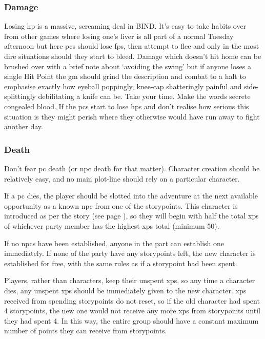 \begin{multicols}{2}
\subsubsection{Damage}

Losing \gls{hp} is a massive, screaming deal in BIND.
It's easy to take habits over from other games where losing one's liver is all part of a normal Tuesday afternoon but here \glspl{pc} should lose \glspl{fp}, then attempt to flee and only in the most dire situations should they start to bleed.
Damage which doesn't hit home can be brushed over with a brief note about `avoiding the swing' but if anyone loses a single Hit Point the \gls{gm} should grind the description and combat to a halt to emphasise exactly how eyeball poppingly, knee-cap shatteringly painful and side-splittingly debilitating a knife can be.
Take your time.
Make the words secrete congealed blood.
If the \glspl{pc} start to lose \glspl{hp} and don't realise how serious this situation is they might perish where they otherwise would have run away to fight another day.

\subsubsection{Death}
\label{pcdeath}

Don't fear \gls{pc} death (or \gls{npc} death for that matter).
Character creation should be relatively easy, and no main plot-line should rely on a particular character.

If a \gls{pc} dies, the player should be slotted into the adventure at the next available opportunity as a known \gls{npc} from one of the \glspl{storypoint}.
This character is introduced as per the story  (see page \pageref{oldnpc}), so they will begin with half the total \glspl{xp} of whichever party member has the highest \glspl{xp} total (minimum 50).

If no \glspl{npc} have been established, anyone in the part can establish one immediately.
If none of the party have any \glspl{storypoint} left, the new character is established for free, with the same rules as if a \gls{storypoint} had been spent.

Players, rather than characters, keep their unspent \glspl{xp}, so any time a character dies, any unspent \glspl{xp} should be immediately given to the new character.
\Glspl{xp} received from spending \glspl{storypoint} do not reset, so if the old character had spent 4 \glspl{storypoint}, the new one would not receive any more \glspl{xp} from \glspl{storypoint} until they had spent 4.
In this way, the entire group should have a constant maximum number of points they can receive from \glspl{storypoint}.


\end{multicols}
